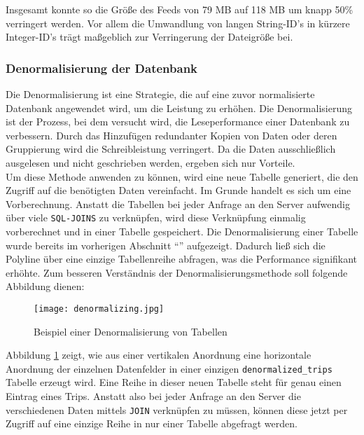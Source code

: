     Insgesamt konnte so die Größe des Feeds von 79 MB auf 118 MB um knapp 50\% verringert werden. Vor allem die Umwandlung von langen String-ID's in kürzere Integer-ID's trägt maßgeblich zur Verringerung der Dateigröße bei.


  \subsubsection{Denormalisierung der Datenbank}
  \label{ssub:denormalisierung_der_datenbank}
    Die Denormalisierung ist eine Strategie, die auf eine zuvor normalisierte Datenbank angewendet wird, um die Leistung zu erhöhen. Die Denormalisierung ist der Prozess, bei dem versucht wird, die Leseperformance einer Datenbank zu verbessern. Durch das Hinzufügen redundanter Kopien von Daten oder deren Gruppierung wird die Schreibleistung verringert.\parencite{sanders}
    Da die Daten ausschließlich ausgelesen und nicht geschrieben werden, ergeben sich nur Vorteile.\\

    Um diese Methode anwenden zu können, wird eine neue Tabelle generiert, die den Zugriff auf die benötigten Daten vereinfacht. Im Grunde handelt es sich um eine Vorberechnung. Anstatt die Tabellen bei jeder Anfrage an den Server aufwendig über viele \texttt{SQL-JOINS} zu verknüpfen, wird diese Verknüpfung einmalig vorberechnet und in einer Tabelle gespeichert. Die Denormalisierung  einer Tabelle wurde bereits im vorherigen Abschnitt "`"' aufgezeigt. Dadurch ließ sich die Polyline über eine einzige Tabellenreihe abfragen, was die Performance signifikant erhöhte. Zum besseren Verständnis der Denormalisierungsmethode soll folgende Abbildung dienen:

    \begin{figure}[htbp]
      \begin{center}
        \texttt{[image: denormalizing.jpg]}
        \caption{Beispiel einer Denormalisierung von Tabellen}
        \label{fig:denormalizing}
      \end{center}
    \end{figure}

    Abbildung \ref{fig:denormalizing} zeigt, wie aus einer vertikalen Anordnung eine horizontale Anordnung der einzelnen Datenfelder in einer einzigen \texttt{denormalized\_trips} Tabelle erzeugt wird. Eine Reihe in dieser neuen Tabelle steht für genau einen Eintrag eines Trips. Anstatt also bei jeder Anfrage an den Server die verschiedenen Daten mittels \texttt{JOIN} verknüpfen zu müssen, können diese jetzt per Zugriff auf eine einzige Reihe in nur einer Tabelle abgefragt werden.

